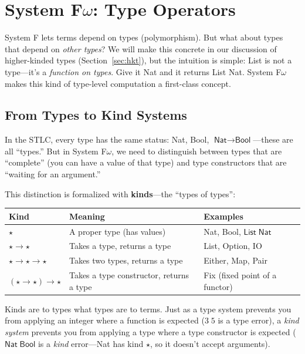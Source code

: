 \documentclass[11pt,a4paper]{article}
\theoremstyle{definition}
\begin{document}
\section{System F$\omega$: Type Operators}\label{sec:fomega}

System F lets terms depend on types (polymorphism). But what about types that
depend on \emph{other types}? We will make this concrete in our
discussion of higher-kinded types (Section~\ref{sec:hkt}), but the intuition is simple: \textsf{List} is
not a type---it's a \emph{function on types}. Give it \textsf{Nat} and it
returns \textsf{List Nat}. System F$\omega$ makes this kind of type-level
computation a first-class concept.

\subsection{From Types to Kind Systems}

In the STLC, every type has the same status: \textsf{Nat}, \textsf{Bool},
$\textsf{Nat} \to \textsf{Bool}$---these are all ``types.'' But in System
F$\omega$, we need to distinguish between types that are ``complete'' (you can
have a value of that type) and type constructors that are ``waiting for an
argument.''

This distinction is formalized with \textbf{kinds}---the ``types of types'':

\begin{center}
\renewcommand{\arraystretch}{1.4}
\begin{tabular}{lll}
\textbf{Kind} & \textbf{Meaning} & \textbf{Examples} \\
\hline
$\star$ & A proper type (has values) & \textsf{Nat}, \textsf{Bool},
  $\textsf{List}\;\textsf{Nat}$ \\
$\star \to \star$ & Takes a type, returns a type & \textsf{List},
  \textsf{Option}, \textsf{IO} \\
$\star \to \star \to \star$ & Takes two types, returns a type &
  \textsf{Either}, \textsf{Map}, \textsf{Pair} \\
$(\star \to \star) \to \star$ & Takes a type constructor, returns a type &
  \textsf{Fix} (fixed point of a functor) \\
\end{tabular}
\end{center}

Kinds are to types what types are to terms. Just as a type system prevents you
from applying an integer where a function is expected ($3\;5$ is a type error),
a \emph{kind system} prevents you from applying a type where a type constructor
is expected ($\textsf{Nat}\;\textsf{Bool}$ is a \emph{kind} error---\textsf{Nat}
has kind $\star$, so it doesn't accept arguments).
\end{document}
